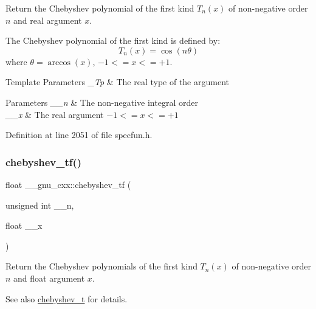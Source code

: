 Return the Chebyshev polynomial of the first kind $ T_n(x) $ of non-\/negative order $ n $ and real argument $ x $.

The Chebyshev polynomial of the first kind is defined by\+: \[ T_n(x) = \cos(n \theta) \] where $ \theta = \arccos(x) $, $ -1 <= x <= +1 $.


\begin{DoxyTemplParams}{Template Parameters}
{\em \+\_\+\+Tp} & The real type of the argument \\
\hline
\end{DoxyTemplParams}

\begin{DoxyParams}{Parameters}
{\em \+\_\+\+\_\+n} & The non-\/negative integral order \\
\hline
{\em \+\_\+\+\_\+x} & The real argument $ -1 <= x <= +1 $ \\
\hline
\end{DoxyParams}


Definition at line 2051 of file specfun.\+h.

\mbox{\label{group__gnu__math__spec__func_gab8cdb55702d9c8b85af4ecc3d8c6a134}} 
\subsubsection{\texorpdfstring{chebyshev\+\_\+tf()}{chebyshev\_tf()}}
{\footnotesize\ttfamily float \+\_\+\+\_\+gnu\+\_\+cxx\+::chebyshev\+\_\+tf (\begin{DoxyParamCaption}\item[{unsigned int}]{\+\_\+\+\_\+n,  }\item[{float}]{\+\_\+\+\_\+x }\end{DoxyParamCaption})\hspace{0.3cm}{\ttfamily [inline]}}

Return the Chebyshev polynomials of the first kind $ T_n(x) $ of non-\/negative order $ n $ and {\ttfamily float} argument $ x $.

\begin{DoxySeeAlso}{See also}
\hyperlink{group__gnu__math__spec__func_ga4d9cae9de13a64ceeb4fb0226f4b7844}{chebyshev\+\_\+t} for details. 
\end{DoxySeeAlso}


